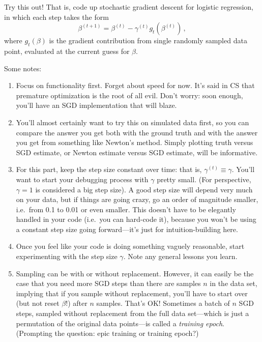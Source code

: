 \documentclass{article}
\begin{document}
\begin{enumerate}[label=(\Alph*)]
Try this out!  That is, code up stochastic gradient descent for logistic regression, in which each step takes the form
$$
\beta^{(t+1)} = \beta^{(t)} - \gamma^{(t)} g_t (\beta^{(t)}) \, ,
$$
where $g_t (\beta)$ is the gradient contribution from single randomly sampled data point, evaluated at the current guess for $\beta$.

Some notes:
\begin{enumerate}[label=\arabic*.]
\item Focus on functionality first.  Forget about speed for now.  It's said in CS that premature optimization is the root of all evil.  Don't worry: soon enough, you'll have an SGD implementation that will blaze.
\item You'll almost certainly want to try this on simulated data first, so you can compare the answer you get both with the ground truth and with the answer you get from something like Newton's method.  Simply plotting truth versus SGD estimate, or Newton estimate versus SGD estimate, will be informative.
\item For this part,  keep the step size constant over time: that is, $\gamma^{(t)} \equiv \gamma$.  You'll want to start your debugging process with $\gamma$ pretty small.  (For perspective, $\gamma = 1$ is considered a big step size).  A good step size will depend very much on your data, but if things are going crazy, go an order of magnitude smaller, i.e.~from 0.1 to 0.01 or even smaller.  This doesn't have to be elegantly handled in your code (i.e.~you can hard-code it), because you won't be using a constant step size going forward---it's just for intuition-building here.
\item Once you feel like your code is doing something vaguely reasonable, start experimenting with the step size $\gamma$.  Note any general lessons you learn.
\item Sampling can be with or without replacement.  However, it can easily be the case that you need more SGD steps than there are samples $n$ in the data set, implying that if you sample without replacement, you'll have to start over (but not reset $\beta$!) after $n$ samples.   That's OK!  Sometimes a batch of $n$ SGD steps, sampled without replacement from the full data set---which is just a permutation of the original data points---is called a \textit{training epoch}.  (Prompting the question: epic training or training epoch?)
\end{enumerate}



\end{enumerate}
\end{document}
